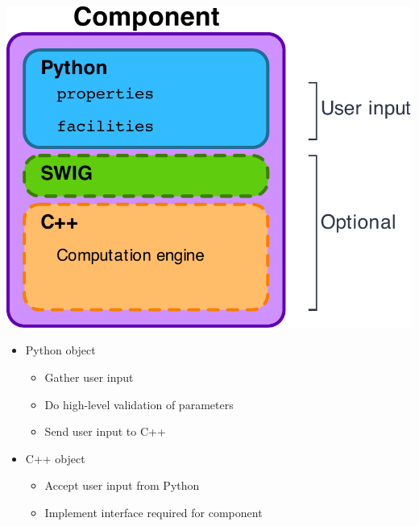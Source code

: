 \documentclass[pdftex,cig,slideColor]{pp4slides}
\begin{document}
  \summary{}

  \vfill
  \begin{center}
    \includegraphics[scale=1.0]{figs/component}
  \end{center}  
  \vfill


  \summary{}

  \begin{itemize}
  \item Python object
    \begin{itemize}
    \item Gather user input
    \item Do high-level validation of parameters
    \item Send user input to C++
    \end{itemize}
  \item C++ object
    \begin{itemize}
    \item Accept user input from Python
    \item Implement interface required for component
    \end{itemize}
  \end{itemize}


\end{document}
